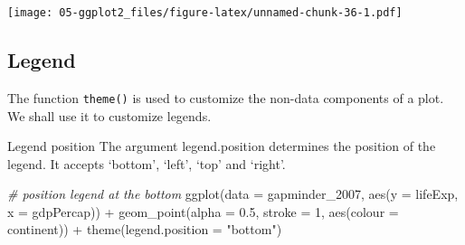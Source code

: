 \documentclass[
]{book}
\newenvironment{Shaded}{\begin{snugshade}}{\end{snugshade}}
\newcommand{\AttributeTok}[1]{\textcolor[rgb]{0.77,0.63,0.00}{#1}}
\newcommand{\CommentTok}[1]{\textcolor[rgb]{0.56,0.35,0.01}{\textit{#1}}}
\newcommand{\DecValTok}[1]{\textcolor[rgb]{0.00,0.00,0.81}{#1}}
\newcommand{\FloatTok}[1]{\textcolor[rgb]{0.00,0.00,0.81}{#1}}
\newcommand{\FunctionTok}[1]{\textcolor[rgb]{0.00,0.00,0.00}{#1}}
\newcommand{\NormalTok}[1]{#1}
\newcommand{\SpecialCharTok}[1]{\textcolor[rgb]{0.00,0.00,0.00}{#1}}
\newcommand{\StringTok}[1]{\textcolor[rgb]{0.31,0.60,0.02}{#1}}
\begin{document}
\begin{Shaded}
\end{Shaded}

\texttt{[image: 05-ggplot2\_files/figure-latex/unnamed-chunk-36-1.pdf]}

\hypertarget{legend}{%
\subsection{Legend}\label{legend}}

The function \texttt{theme()} is used to customize the non-data components of a plot. We shall use it to customize legends.

Legend position
The argument legend.position determines the position of the legend. It accepts `bottom', `left', `top' and `right'.

\begin{Shaded}
\begin{Highlighting}[]
\CommentTok{\# position legend at the bottom}
\FunctionTok{ggplot}\NormalTok{(}\AttributeTok{data =}\NormalTok{ gapminder\_2007, }\FunctionTok{aes}\NormalTok{(}\AttributeTok{y =}\NormalTok{ lifeExp, }\AttributeTok{x =}\NormalTok{ gdpPercap)) }\SpecialCharTok{+} 
  \FunctionTok{geom\_point}\NormalTok{(}\AttributeTok{alpha =} \FloatTok{0.5}\NormalTok{, }\AttributeTok{stroke =} \DecValTok{1}\NormalTok{, }\FunctionTok{aes}\NormalTok{(}\AttributeTok{colour =}\NormalTok{ continent)) }\SpecialCharTok{+}
  \FunctionTok{theme}\NormalTok{(}\AttributeTok{legend.position =} \StringTok{"bottom"}\NormalTok{)}
\end{Highlighting}
\end{Shaded}
\end{document}
